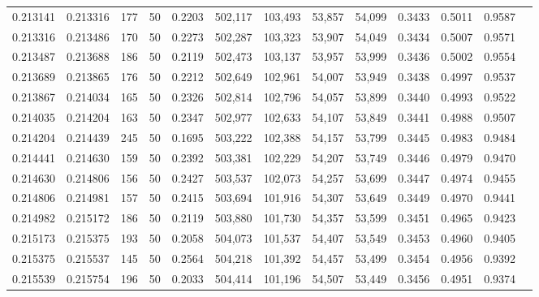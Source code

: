 \begin{tabular}{rrrrrrrrrrrrr}
0.213141 & 0.213316 &   177 &  50 &                                     0.2203 & 502,117 & 103,493 &  53,857 &  54,099 & 0.3433 & 0.5011 & 0.9587 \\
0.213316 & 0.213486 &   170 &  50 &                                     0.2273 & 502,287 & 103,323 &  53,907 &  54,049 & 0.3434 & 0.5007 & 0.9571 \\
0.213487 & 0.213688 &   186 &  50 &                                     0.2119 & 502,473 & 103,137 &  53,957 &  53,999 & 0.3436 & 0.5002 & 0.9554 \\
0.213689 & 0.213865 &   176 &  50 &                                     0.2212 & 502,649 & 102,961 &  54,007 &  53,949 & 0.3438 & 0.4997 & 0.9537 \\
0.213867 & 0.214034 &   165 &  50 &                                     0.2326 & 502,814 & 102,796 &  54,057 &  53,899 & 0.3440 & 0.4993 & 0.9522 \\
0.214035 & 0.214204 &   163 &  50 &                                     0.2347 & 502,977 & 102,633 &  54,107 &  53,849 & 0.3441 & 0.4988 & 0.9507 \\
0.214204 & 0.214439 &   245 &  50 &                                     0.1695 & 503,222 & 102,388 &  54,157 &  53,799 & 0.3445 & 0.4983 & 0.9484 \\
0.214441 & 0.214630 &   159 &  50 &                                     0.2392 & 503,381 & 102,229 &  54,207 &  53,749 & 0.3446 & 0.4979 & 0.9470 \\
0.214630 & 0.214806 &   156 &  50 &                                     0.2427 & 503,537 & 102,073 &  54,257 &  53,699 & 0.3447 & 0.4974 & 0.9455 \\
0.214806 & 0.214981 &   157 &  50 &                                     0.2415 & 503,694 & 101,916 &  54,307 &  53,649 & 0.3449 & 0.4970 & 0.9441 \\
0.214982 & 0.215172 &   186 &  50 &                                     0.2119 & 503,880 & 101,730 &  54,357 &  53,599 & 0.3451 & 0.4965 & 0.9423 \\
0.215173 & 0.215375 &   193 &  50 &                                     0.2058 & 504,073 & 101,537 &  54,407 &  53,549 & 0.3453 & 0.4960 & 0.9405 \\
0.215375 & 0.215537 &   145 &  50 &                                     0.2564 & 504,218 & 101,392 &  54,457 &  53,499 & 0.3454 & 0.4956 & 0.9392 \\
0.215539 & 0.215754 &   196 &  50 &                                     0.2033 & 504,414 & 101,196 &  54,507 &  53,449 & 0.3456 & 0.4951 & 0.9374 \\

\end{tabular}
